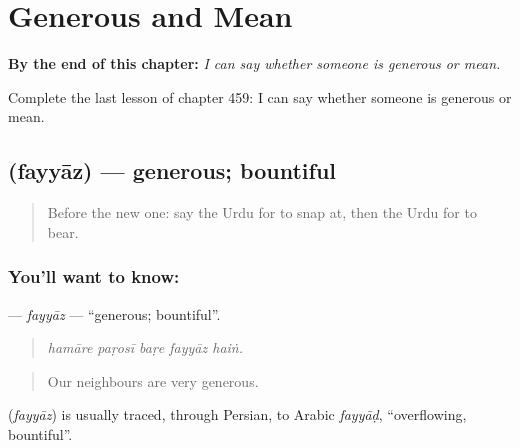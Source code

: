 
\chapter{Generous and Mean}
\label{ch:ur-generous-and-mean}

\begin{chapteropening}
\textbf{By the end of this chapter:} \emph{I can say whether someone is generous or mean.}

Complete the last lesson of chapter 459: I can say whether someone is generous or mean.
\end{chapteropening}

\section[\texorpdfstring{\ur{فیاض} (fayyāz)}{فیاض (fayyāz)}]{ (fayyāz) — generous; bountiful}

\label{lesson:UR-C459-fayyaz}



\begin{quote}
Before the new one: say the Urdu for to snap at, then the Urdu for to bear.
\end{quote}

\subsection*{You'll want to know: }
\textbf{} — \emph{fayyāz} — \textquotedblleft{}generous; bountiful\textquotedblright{}.

\begin{quote}
    
\end{quote}

\begin{quote}
\emph{hamāre paṛosī baṛe fayyāz haiṅ.}
\end{quote}

\begin{quote}
Our neighbours are very generous.
\end{quote}

\begin{cousinweb}
\textbf{} (\emph{fayyāz}) is usually traced, through Persian, to Arabic \emph{fayyāḍ}, \textquotedblleft{}overflowing, bountiful\textquotedblright{}.
\end{cousinweb}

